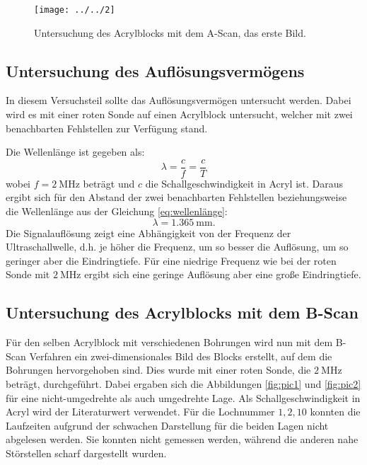 \begin{figure}[h!]
	\centering
	\texttt{[image: ../../2]}
	\caption{Untersuchung des Acrylblocks mit dem A-Scan, das erste Bild.}
	\label{fig:2}
\end{figure}


\subsection{Untersuchung des Auflösungsvermögens}
In diesem Versuchsteil sollte das Auflösungsvermögen untersucht werden. Dabei wird es mit einer roten Sonde auf einen Acrylblock untersucht, welcher mit zwei benachbarten Fehlstellen zur Verfügung stand.

Die Wellenlänge\cite{Wellenlänge} ist gegeben als:
\begin{equation}
\label{eq:wellenlänge}
\lambda = \frac{c}{f} = \frac{c}{T}
\end{equation}
wobei $f =\SI{2}{\mega\hertz}$ beträgt und $c$ die Schallgeschwindigkeit in Acryl ist.
Daraus ergibt sich für den Abstand der zwei benachbarten Fehlstellen beziehungsweise die Wellenlänge aus der Gleichung \ref{eq:wellenlänge}:
\begin{equation*}
\lambda = \SI{1,365}{\milli\meter}.
\end{equation*}
Die Signalauflösung zeigt eine Abhängigkeit von der Frequenz der Ultraschallwelle, d.h. je höher die Frequenz, um so besser die Auflösung, um so geringer aber die Eindringtiefe. Für eine niedrige Frequenz wie bei der roten Sonde mit $\SI{2}{\mega\hertz}$ ergibt sich eine geringe Auflösung aber eine große Eindringtiefe.
 
\subsection{Untersuchung des Acrylblocks mit dem B-Scan}

Für den selben Acrylblock mit verschiedenen Bohrungen wird nun mit dem B-Scan Verfahren ein zwei-dimensionales Bild des Blocks erstellt, auf dem die Bohrungen hervorgehoben sind. Dies wurde mit einer roten Sonde, die $\SI{2}{\mega\hertz}$ beträgt, durchgeführt. Dabei ergaben sich die Abbildungen \ref{fig:pic1} und \ref{fig:pic2} für eine nicht-umgedrehte als auch umgedrehte Lage. Als Schallgeschwindigkeit in Acryl wird der Literaturwert\cite{Velocities} verwendet. Für die Lochnummer $1,2,10$ konnten die Laufzeiten aufgrund der schwachen Darstellung für die beiden Lagen nicht abgelesen werden. Sie konnten nicht gemessen werden, während die anderen nahe Störstellen scharf dargestellt wurden.

